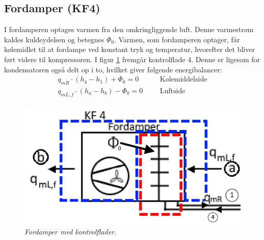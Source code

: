 \documentclass[../Hovedrapport.tex]{subfiles}
\begin{document}
\subsection{Fordamper (KF4)}
\begin{minipage}[t]{0.5\textwidth}
I fordamperen optages varmen fra den omkringliggende luft. Denne varmestrøm kaldes kuldeydelsen og betegnes $\Phi_0$. Varmen, som fordamperen optager, får kølemidlet til at fordampe ved konstant tryk og temperatur, hvorefter det bliver ført videre til kompressoren.
I figur \ref{fig:Fordamper-KF} fremgår kontrolflade 4. Denne er ligesom for kondensatoren også delt op i to, hvilket giver følgende energibalancer: 
\begin{align}
\label{eq:fordamperkm}
q_{mR} \cdot (h_4-h_1) + \Phi_0 = 0     &&&\text{Kølemiddelside} \\
q_{mL,f} \cdot (h_{a}-h_{b}) - \Phi_0 = 0     &&&\text{Luftside}
\end{align}
\end{minipage}
\begin{minipage}[t]{0.5\textwidth}
\begin{figure}[H] %
	\centering
	\includegraphics[width=1\textwidth]{Billeder/KF_4}
	\caption{\textit{Fordamper med kontrolflader}.}
	\label{fig:Fordamper-KF}
\end{figure}
\end{minipage}
\end{document}
